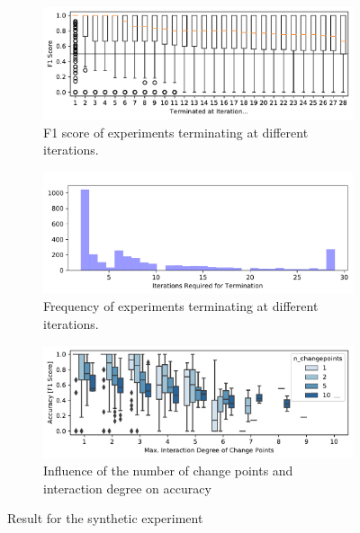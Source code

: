 \documentclass[sigconf]{acmart}
\begin{document}
	\begin{figure}
		\begin{subfigure}{\linewidth}
			\centering
			\includegraphics[width=\linewidth]{images/accuracy_after_termination.pdf}
			\vspace{-5mm}
			\caption{F1 score of experiments terminating at different iterations.}	
			\label{fig:results_rq1_accuracy_terminated}
		\end{subfigure}
		\begin{subfigure}{\linewidth}
			\centering
			\vspace{1mm}
			\includegraphics[width=\linewidth]{images/iterations_for_termination.pdf}
			\vspace{-5mm}
			\caption{Frequency of experiments terminating at different iterations.}	
			\label{fig:results_rq1_frequency}
		\end{subfigure}
		\begin{subfigure}{\linewidth}
			\vspace{4mm}
			\centering
			\includegraphics[width=\linewidth]{images/max_degree_after_termination}
			\caption{Influence of the number of change points and interaction degree on accuracy}	
			\label{fig:results_rq1_degree}
		\end{subfigure}
		\caption{Result for the synthetic experiment}
		\label{fig:results_rq1:results_rq1_degree}
	\end{figure} 	
\end{document}
